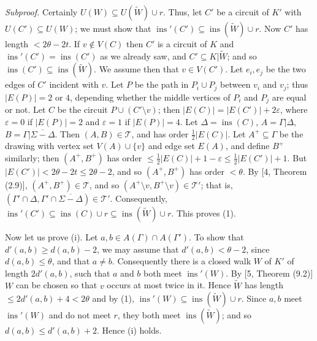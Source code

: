\textit{Subproof.} Certainly $U(W) \subseteq U(\widetilde{W}) \cup r$. Thus, let $C'$ be a circuit of $K'$ with $U(C') \subseteq U(W)$; we must show that $\operatorname{ins}'(C') \subseteq \operatorname{ins}(\widetilde{W}) \cup r$. Now $C'$ has length $< 2\theta - 2t$. If $v \notin V(C)$ then $C'$ is a circuit of $K$ and $\operatorname{ins}'(C') = \operatorname{ins}(C')$ as we already saw, and $C' \subseteq K | \widetilde{W}$; and so $\operatorname{ins}(C') \subseteq \operatorname{ins}(\widetilde{W})$. We assume then that $v \in V(C')$. Let $e_i, e_j$ be the two edges of $C'$ incident with $v$. Let $P$ be the path in $P_i \cup P_j$ between $v_i$ and $v_j$; thus $|E(P)| = 2$ or $4$, depending whether the middle vertices of $P_i$ and $P_j$ are equal or not. Let $C$ be the circuit $P \cup (C' \setminus v)$; then $|E(C)| = |E(C')| + 2\varepsilon$, where $\varepsilon = 0$ if $|E(P)| = 2$ and $\varepsilon = 1$ if $|E(P)| = 4$. Let $\Delta = \operatorname{ins}(C)$, $A = \Gamma | \Delta$, $B = \Gamma | \overline{\Sigma - \Delta}$. Then $(A, B) \in \mathscr{T}$, and has order $\frac{1}{2}|E(C)|$. Let $A^+ \subseteq \Gamma$ be the drawing with vertex set $V(A) \cup \{v\}$ and edge set $E(A)$, and define $B^+$ similarly; then $(A^+, B^+)$ has order $\le \frac{1}{2}|E(C)| + 1 - \varepsilon \le \frac{1}{2}|E(C')| + 1$. But $|E(C')| < 2\theta - 2t \le 2\theta - 2$, and so $(A^+, B^+)$ has order $< \theta$. By [4, Theorem (2.9)], $(A^+, B^+) \in \mathscr{T}$, and so $(A^+ \setminus v, B^+ \setminus v) \in \mathscr{T}'$; that is, $(\Gamma' \cap \Delta, \Gamma' \cap \overline{\Sigma - \Delta}) \in \mathscr{T}'$. Consequently, $\operatorname{ins}'(C') \subseteq \operatorname{ins}(C) \cup r \subseteq \operatorname{ins}(\widetilde{W}) \cup r$. This proves (1).

Now let us prove (i). Let $a, b \in A(\Gamma) \cap A(\Gamma')$. To show that $d'(a, b) \ge d(a, b) - 2$, we may assume that $d'(a, b) < \theta - 2$, since $d(a, b) \le \theta$, and that $a \ne b$. Consequently there is a closed walk $W$ of $K'$ of length $2d'(a, b)$, such that $a$ and $b$ both meet $\operatorname{ins}'(W)$. By [5, Theorem (9.2)] $W$ can be chosen so that $v$ occurs at most twice in it. Hence $\widetilde{W}$ has length $\le 2d'(a, b) + 4 < 2\theta$ and by (1), $\operatorname{ins}'(W) \subseteq \operatorname{ins}(\widetilde{W}) \cup r$. Since $a, b$ meet $\operatorname{ins}'(W)$ and do not meet $r$, they both meet $\operatorname{ins}(\widetilde{W})$; and so $d(a, b) \le d'(a, b) + 2$. Hence (i) holds.


